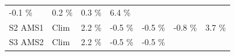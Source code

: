\documentclass[]{article}
\begin{document}
\begin{longtable}[]{@{}lllllll@{}}
\begin{minipage}[t]{0.11\columnwidth}
-0.1 \%\strut
\end{minipage} & \begin{minipage}[t]{0.11\columnwidth}\raggedright\strut
0.2 \%\strut
\end{minipage} & \begin{minipage}[t]{0.11\columnwidth}\raggedright\strut
0.3 \%\strut
\end{minipage} & \begin{minipage}[t]{0.11\columnwidth}\raggedright\strut
6.4 \%\strut
\end{minipage}\tabularnewline
\begin{minipage}[t]{0.14\columnwidth}\raggedright\strut
S2 AMS1\strut
\end{minipage} & \begin{minipage}[t]{0.13\columnwidth}\raggedright\strut
Clim\strut
\end{minipage} & \begin{minipage}[t]{0.11\columnwidth}\raggedright\strut
2.2 \%\strut
\end{minipage} & \begin{minipage}[t]{0.11\columnwidth}\raggedright\strut
-0.5 \%\strut
\end{minipage} & \begin{minipage}[t]{0.11\columnwidth}\raggedright\strut
-0.5 \%\strut
\end{minipage} & \begin{minipage}[t]{0.11\columnwidth}\raggedright\strut
-0.8 \%\strut
\end{minipage} & \begin{minipage}[t]{0.11\columnwidth}\raggedright\strut
3.7 \%\strut
\end{minipage}\tabularnewline
\begin{minipage}[t]{0.14\columnwidth}\raggedright\strut
S3 AMS2\strut
\end{minipage} & \begin{minipage}[t]{0.13\columnwidth}\raggedright\strut
Clim\strut
\end{minipage} & \begin{minipage}[t]{0.11\columnwidth}\raggedright\strut
2.2 \%\strut
\end{minipage} & \begin{minipage}[t]{0.11\columnwidth}\raggedright\strut
-0.5 \%\strut
\end{minipage} & \begin{minipage}[t]{0.11\columnwidth}\raggedright\strut
-0.5 \%\strut
\end{minipage} & \begin{minipage}[t]{0.11\columnwidth}\raggedright\strut

\end{minipage}
\end{longtable}
\end{document}
